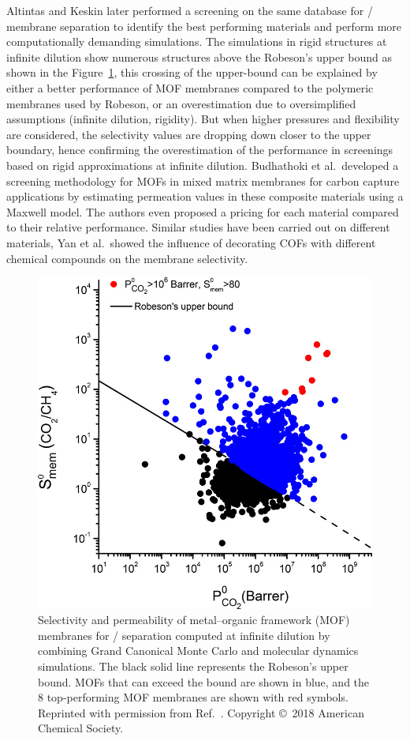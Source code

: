 \documentclass[main.tex]{subfiles}
\begin{document}
Altintas and Keskin later performed a screening on the same database for / membrane separation to identify the best performing materials and perform more computationally demanding simulations.\autocite{Altintas_2018} {The simulations in rigid structures at infinite dilution show numerous structures above the Robeson's upper bound as shown in the Figure~\ref{fgr:Altintas_2018}, this crossing of the upper-bound can be explained by either a better performance of MOF membranes compared to the polymeric membranes used by Robeson, or an overestimation due to oversimplified assumptions (infinite dilution, rigidity). But when higher pressures and flexibility are considered, the selectivity values are dropping down closer to the upper boundary}, hence confirming the overestimation of the performance in screenings {based on rigid approximations at infinite dilution}.  Budhathoki et al.\ developed a screening methodology for MOFs in mixed matrix membranes for carbon capture applications by estimating permeation values in these composite materials using a Maxwell model.\autocite{Budhathoki_2019} The authors even proposed a pricing for each material compared to their relative performance. Similar studies have been carried out on different materials, Yan et al.\ showed the influence of decorating COFs with different chemical compounds on the membrane selectivity.\autocite{Yan_2018}

\begin{figure}[ht]
\centering
  \includegraphics[width=0.5\linewidth]{figures/1-screening/Altintas_2018.jpeg}
  \caption{Selectivity and permeability of metal--organic framework (MOF) membranes for / separation computed at infinite dilution by combining Grand Canonical Monte Carlo and molecular dynamics simulations.\autocite{Altintas_2018} The black solid line represents the Robeson's upper bound.\autocite{robeson1991correlation, Robeson_2008} MOFs that can exceed the bound are shown in blue, and the 8 top-performing MOF membranes are shown with red symbols. Reprinted with permission from Ref.~\cite{Altintas_2018}. Copyright \copyright\  2018 American Chemical Society.}\label{fgr:Altintas_2018}
\end{figure}
\end{document}
